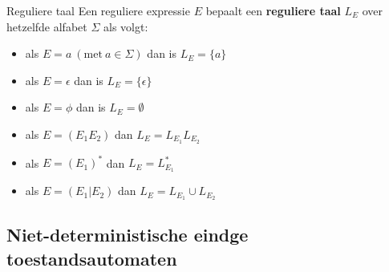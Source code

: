\begin{theo}{Reguliere taal}
    Een reguliere expressie $E$ bepaalt een \textbf{reguliere taal} $L_E$ over hetzelfde alfabet $\Sigma$ als volgt:
    \begin{itemize}
        \item als $E = a \ (\text{met} \ a \in \Sigma)$ dan is $L_E = \{a\}$
        \item als $E = \epsilon$ dan is $L_E = \{\epsilon\}$
        \item als $E = \phi$ dan is $L_E = \emptyset$
        \item als $E = (E_{1}E_{2})$ dan $L_E = L_{E_1}L_{E_2}$
        \item als $E = {(E_{1})}^{*}$ dan $L_E = L_{E_1}^*$
        \item als $E = (E_{1}|E_{2})$ dan $L_E = L_{E_1} \cup L_{E_2}$
    \end{itemize}
    \vspace{-0.3cm}
\end{theo}

\newpage

\subsection{Niet-deterministische eindge toestandsautomaten}

\vspace{0.5cm}


